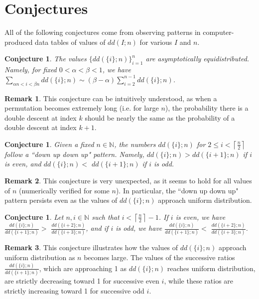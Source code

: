 \documentclass[11pt, a4paper, reqno]{article}
\numberwithin{equation}{section}
\newcommand{\ds}{\displaystyle}
\newcommand{\N}{\mathbb{N}}
\newtheorem{conjecture}[theorem]{Conjecture}
\theoremstyle{definition}
\newtheorem*{remark*}{Remark}
\begin{document}
	\section{Conjectures}\label{conjs}
	
	 All of the following conjectures come from observing patterns in computer-produced data tables of values of $dd(I;n)$ for various $I$ and $n$. 
	 
	 \begin{conjecture}
		The values $\{dd(\{i\}; n)\}_{i=1}^n$ are asymptotically equidistributed. Namely, for fixed $0 < \alpha < \beta < 1$, we have $\ds \sum_{\alpha n < i < \beta n}dd(\{i\}; n) \sim (\beta - \alpha)\sum_{i=2}^{n-1}dd(\{i\};n)$.
	\end{conjecture}
	
	\begin{remark*}
	    This conjecture can be intuitively understood, as when a permutation becomes extremely long (i.e. for large $n$), the probability there is a double descent at index $k$ should be nearly the same as the probability of a double descent at index $k+1$.
	\end{remark*}

	\begin{conjecture}
		Given a fixed $n \in \N$, the numbers $dd(\{i\};n)$ for $2 \leq i < \left \lceil \frac{n}{2} \right \rceil$ follow a ``down up down up" pattern. Namely, $dd(\{i\}; n) > dd(\{i + 1\}; n)$ if $i$ is even, and $dd(\{i\}; n) < $ $dd(\{i + 1\}; n)$ if $i$ is odd.
	\end{conjecture}
	
	\begin{remark*}
	    This conjecture is very unexpected, as it seems to hold for all values of $n$ (numerically verified for some $n$). In particular, the ``down up down up" pattern persists even as the values of $dd(\{i\};n)$ approach uniform distribution.
	\end{remark*}
	
	\begin{conjecture}
		Let $n,i \in \N$ such that $i < \left \lceil \frac{n}{2} \right \rceil - 1$. If $i$ is even, we have $\frac{dd(\{i\}; n)}{dd(\{i+1\}; n)}>$ $\frac{dd(\{i+2\}; n)}{dd(\{i+3\}; n)}$, and if $i$ is odd, we have $\frac{dd(\{i\}; n)}{dd(\{i+1\}; n)}<$ $\frac{dd(\{i+2\}; n)}{dd(\{i+3\}; n)}$.
	\end{conjecture}
	
	\begin{remark*}
	    This conjecture illustrates how the values of $dd(\{i\};n)$ approach uniform distribution as $n$ becomes large. The values of the successive ratios $\frac{dd(\{i\}; n)}{dd(\{i+1\}; n)}$, which are approaching 1 as $dd(\{i\};n)$ reaches uniform distribution, are strictly decreasing toward 1 for successive even $i$, while these ratios are strictly increasing toward 1 for successive odd $i$.
	\end{remark*}
	
\end{document}
